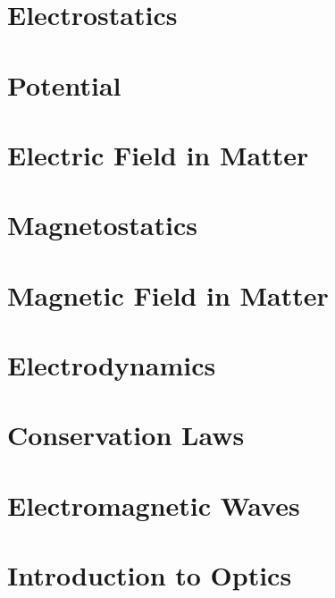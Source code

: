 \documentclass[10pt]{report}
\begin{document}
\section{Electrostatics}
\clearpage
\clearpage

\section{Potential}
\clearpage
\clearpage

\section{Electric Field in Matter}
\clearpage

\section{Magnetostatics}
\clearpage
\clearpage

\section{Magnetic Field in Matter}
\clearpage

\section{Electrodynamics}
\clearpage
\clearpage

\section{Conservation Laws}
\clearpage

\section{Electromagnetic Waves}
\clearpage

\section{Introduction to Optics}
\clearpage
\end{document}
